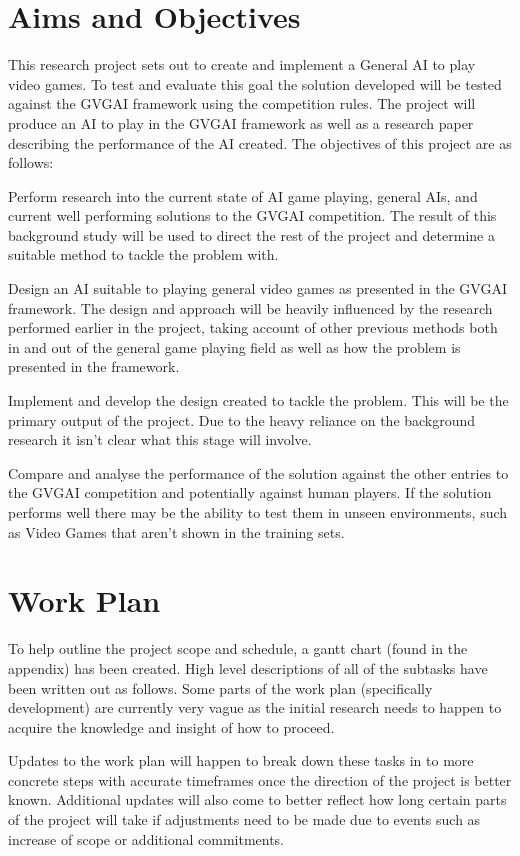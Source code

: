 \documentclass[a4paper]{article}
\begin{document}
\section{Aims and Objectives}
This research project sets out to create and implement a General AI to play video games.
To test and evaluate this goal the solution developed will be tested against the GVGAI framework using the competition rules.\cite{GVGAI2014}
The project will produce an AI to play in the GVGAI framework as well as a research paper describing the performance of the AI created.
The objectives of this project are as follows:
\begin{description}
    \setlength{\parskip}{0pt}
    \item [Background Research]
    Perform research into the current state of AI game playing, general AIs, and current well performing solutions to the GVGAI competition.
    The result of this background study will be used to direct the rest of the project and determine a suitable method to tackle the problem with.

    \item [Design a General AI]
    Design an AI suitable to playing general video games as presented in the GVGAI framework.
    The design and approach will be heavily influenced by the research performed earlier in the project, taking account of other previous methods both in and out of the general game playing field as well as how the problem is presented in the framework.

    \item [Develop a General AI]
    Implement and develop the design created to tackle the problem.
    This will be the primary output of the project.
    Due to the heavy reliance on the background research it isn't clear what this stage will involve.

    \item [Evaluation and Analysis of Solution]
    Compare and analyse the performance of the solution against the other entries to the GVGAI competition and potentially against human players.
    If the solution performs well there may be the ability to test them in unseen environments, such as Video Games that aren't shown in the training sets.
\end{description}

\section{Work Plan}
To help outline the project scope and schedule, a gantt chart (found in the appendix) has been created.
High level descriptions of all of the subtasks have been written out as follows.
Some parts of the work plan (specifically development) are currently very vague as the initial research needs to happen to acquire the knowledge and insight of how to proceed.
\par
Updates to the work plan will happen to break down these tasks in to more concrete steps with accurate timeframes once the direction of the project is better known.
Additional updates will also come to better reflect how long certain parts of the project will take if adjustments need to be made due to events such as increase of scope or additional commitments.
\end{document}

